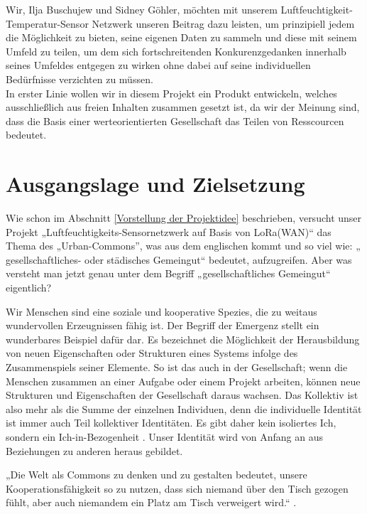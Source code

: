 Wir, Ilja Buschujew und Sidney Göhler, möchten mit unserem Luftfeuchtigkeit-Temperatur-Sensor Netzwerk unseren Beitrag dazu leisten, um prinzipiell jedem die Möglichkeit zu bieten, seine eigenen Daten zu sammeln und diese mit seinem Umfeld zu teilen, um dem sich fortschreitenden Konkurenzgedanken innerhalb seines Umfeldes entgegen zu wirken ohne dabei auf seine individuellen Bedürfnisse verzichten zu müssen.\\
In erster Linie wollen wir in diesem Projekt\cite{schimmel} ein Produkt entwickeln, welches ausschließlich aus freien Inhalten zusammen gesetzt ist, da wir der Meinung sind, dass die Basis einer werteorientierten Gesellschaft das Teilen von Resscourcen bedeutet.


\section{Ausgangslage und Zielsetzung} \label{Ausgangslage und Zielsetzung}

Wie schon im Abschnitt \ref{Vorstellung der Projektidee} beschrieben, versucht unser Projekt „Luftfeuchtigkeits-Sensornetzwerk auf Basis von LoRa(WAN)“ das Thema des „Urban-Commons”, was aus dem englischen kommt und so viel wie: „ gesellschaftliches- oder städisches Gemeingut“ bedeutet, aufzugreifen. Aber was versteht man jetzt genau unter dem Begriff „gesellschaftliches Gemeingut“ eigentlich?  

Wir Menschen sind eine soziale und kooperative Spezies, die zu weitaus wundervollen Erzeugnissen fähig ist. Der Begriff der Emergenz stellt ein wunderbares Beispiel dafür dar. Es bezeichnet die Möglichkeit der Herausbildung von neuen Eigenschaften oder Strukturen eines Systems infolge des Zusammenspiels seiner Elemente. So ist das auch in der Gesellschaft; wenn die Menschen zusammen an einer Aufgabe oder einem Projekt arbeiten, können neue Strukturen und Eigenschaften der Gesellschaft daraus wachsen. Das Kollektiv ist also mehr als die Summe der einzelnen Individuen, denn die individuelle Identität ist immer auch Teil kollektiver Identitäten. Es gibt daher kein isoliertes Ich, sondern ein Ich-in-Bezogenheit \cite{Bollier2019}. Unser Identität wird von Anfang an aus Beziehungen zu anderen heraus gebildet.  

„Die Welt als Commons zu denken und zu gestalten bedeutet, unsere Kooperationsfähigkeit so zu nutzen, dass sich niemand über den Tisch gezogen fühlt, aber auch niemandem ein Platz am Tisch verweigert wird.“ \cite{Bollier2019}. 

